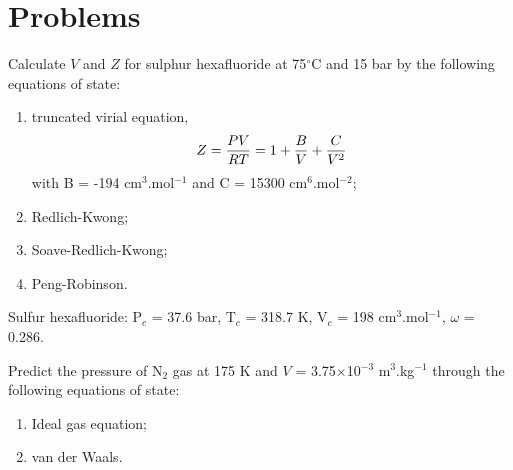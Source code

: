 \clearpage
\section{Problems}
\begin{MyTutorial}{}%
%
  \begin{problem}\label{Chapter:VolumetricPropertiesPureSubstances:Problem:01} %
     Calculate $V$ and $Z$ for sulphur hexafluoride at 75$^{\circ}$C and 15 bar by the following equations of state:
        \begin{enumerate}
          \item truncated virial equation,
             \begin{displaymath}
                Z = \displaystyle\frac{PV}{RT} = 1 + \displaystyle\frac{B}{V} + \displaystyle\frac{C}{V^{2}}
             \end{displaymath}
             with B = -194 cm$^{3}$.mol$^{-1}$ and C = 15300 cm$^{6}$.mol$^{-2}$;
          \item Redlich-Kwong;
          \item Soave-Redlich-Kwong;
          \item Peng-Robinson.
        \end{enumerate}
     Sulfur hexafluoride: P$_{c}$ = 37.6 bar, T$_{c}$ = 318.7 K, V$_{c}$ = 198 cm$^{3}$.mol$^{-1}$, $\omega$ = 0.286.
  \end{problem}
%
  \begin{problem}\label{Chapter:VolumetricPropertiesPureSubstances:Problem:02}\citep{Cengel_Book} %
     Predict the pressure of N$_{2}$ gas at 175 K and $V$ = 3.75$\times$10$^{-3}$ m$^{3}$.kg$^{-1}$ through the following equations of state:
        \begin{enumerate}
          \item Ideal gas equation;
          \item van der Waals.

\end{enumerate}
\end{problem}
\end{MyTutorial}
